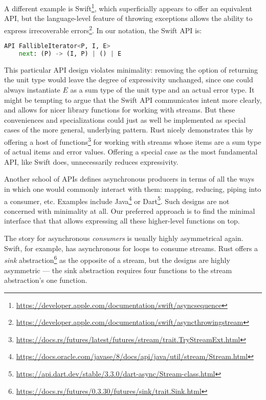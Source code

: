 \documentclass[sigplan,screen,10pt,anonymous,review]{acmart}
\begin{document}
A different example is Swift\footnote{\url{https://developer.apple.com/documentation/swift/asyncsequence}}, which superficially appears to offer an equivalent API, but the language-level feature of throwing exceptions allows the ability to express irrecoverable errors\footnote{\url{https://developer.apple.com/documentation/swift/asyncthrowingstream}}. In our notation, the Swift API is:

\begin{lstlisting}[language=Python]
API FallibleIterator<P, I, E>
    next: (P) -> (I, P) | () | E
\end{lstlisting}

This particular API design violates minimality: removing the option of returning the unit type would leave the degree of expressivity unchanged, since one could always instantiate $E$ as a sum type of the unit type and an actual error type. It might be tempting to argue that the Swift API communicates intent more clearly, and allows for nicer library functions for working with streams. But these conveniences and specializations could just as well be implemented as special cases of the more general, underlying pattern. Rust nicely demonstrates this by offering a host of functions\footnote{\url{https://docs.rs/futures/latest/futures/stream/trait.TryStreamExt.html}} for working with streams whose items are a sum type of actual items and error values. Offering a special case as the most fundamental API, like Swift does, unnecessarily reduces expressivity.

Another school of APIs defines asynchronous producers in terms of all the ways in which one would commonly interact with them: mapping, reducing, piping into a consumer, etc. Examples include Java\footnote{\url{https://docs.oracle.com/javase/8/docs/api/java/util/stream/Stream.html}} or Dart\footnote{\url{https://api.dart.dev/stable/3.3.0/dart-async/Stream-class.html}}. Such designs are not concerned with minimality at all. Our preferred approach is to find the minimal interface that that allows expressing all these higher-level functions on top.

The story for asynchronous \textit{consumers} is usually highly asymmetrical again. Swift, for example, has asynchronous for loops to consume streams. Rust offers a \textit{sink} abstraction\footnote{\url{https://docs.rs/futures/0.3.30/futures/sink/trait.Sink.html}} as the opposite of a stream, but the designs are highly asymmetric --- the sink abstraction requires four functions to the stream abstraction's one function.
\end{document}
